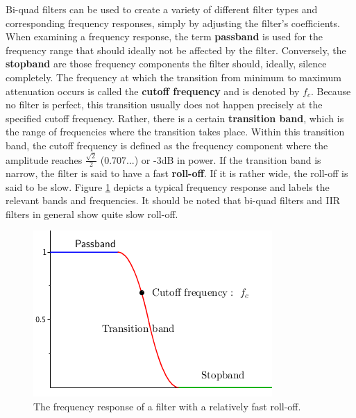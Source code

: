 \documentclass[12pt,twoside]{report}
\begin{document}
Bi-quad filters can be used to create a variety of different filter types and corresponding frequency responses, simply by adjusting the filter's coefficients. When examining a frequency response, the term \textbf{passband} is used for the frequency range that should ideally not be affected by the filter. Conversely, the \textbf{stopband} are those frequency components the filter should, ideally, silence completely. The frequency at which the transition from minimum to maximum attenuation occurs is called the \textbf{cutoff frequency} and is denoted by $f_{c}$. Because no filter is perfect, this transition usually does not happen precisely at the specified cutoff frequency. Rather, there is a certain \textbf{transition band}, which is the range of frequencies where the transition takes place. Within this transition band, the cutoff frequency is defined as the frequency component where the amplitude reaches $\frac{\sqrt{2}}{2}$ (0.707...) or -3dB in power\footnotemark. If the transition band is narrow, the filter is said to have a fast \textbf{roll-off}. If it is rather wide, the roll-off is said to be slow.  Figure \ref{fig:filterterm} depicts a typical frequency response and labels the relevant bands and frequencies. It should be noted that bi-quad filters and IIR filters in general show quite slow roll-off.


\begin{figure}[h!]
  \includegraphics[scale=0.7]{img/filterterm}
  \caption{The frequency response of a filter with a relatively fast roll-off.}
  \label{fig:filterterm}
\end{figure}

\pagebreak
\end{document}
